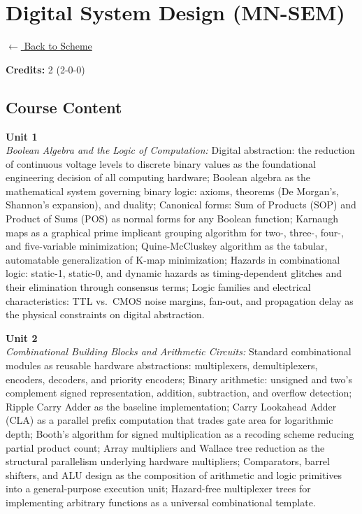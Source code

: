 \section*{Digital System Design (MN-SEM)}
\label{minor:SEM_L1}

\noindent \small{\hyperref[main:scheme]{$\leftarrow$ Back to Scheme}} \vspace{0.5cm}

\noindent \textbf{Credits:} 2 (2-0-0)

\subsection*{Course Content}
\noindent\textbf{Unit 1} \\
\textit{Boolean Algebra and the Logic of Computation:} Digital abstraction: the reduction of continuous voltage levels to discrete binary values as the foundational engineering decision of all computing hardware; Boolean algebra as the mathematical system governing binary logic: axioms, theorems (De Morgan's, Shannon's expansion), and duality; Canonical forms: Sum of Products (SOP) and Product of Sums (POS) as normal forms for any Boolean function; Karnaugh maps as a graphical prime implicant grouping algorithm for two-, three-, four-, and five-variable minimization; Quine-McCluskey algorithm as the tabular, automatable generalization of K-map minimization; Hazards in combinational logic: static-1, static-0, and dynamic hazards as timing-dependent glitches and their elimination through consensus terms; Logic families and electrical characteristics: TTL vs.\ CMOS noise margins, fan-out, and propagation delay as the physical constraints on digital abstraction.

\vspace{0.3cm}

\noindent\textbf{Unit 2} \\
\textit{Combinational Building Blocks and Arithmetic Circuits:} Standard combinational modules as reusable hardware abstractions: multiplexers, demultiplexers, encoders, decoders, and priority encoders; Binary arithmetic: unsigned and two's complement signed representation, addition, subtraction, and overflow detection; Ripple Carry Adder as the baseline implementation; Carry Lookahead Adder (CLA) as a parallel prefix computation that trades gate area for logarithmic depth; Booth's algorithm for signed multiplication as a recoding scheme reducing partial product count; Array multipliers and Wallace tree reduction as the structural parallelism underlying hardware multipliers; Comparators, barrel shifters, and ALU design as the composition of arithmetic and logic primitives into a general-purpose execution unit; Hazard-free multiplexer trees for implementing arbitrary functions as a universal combinational template.

